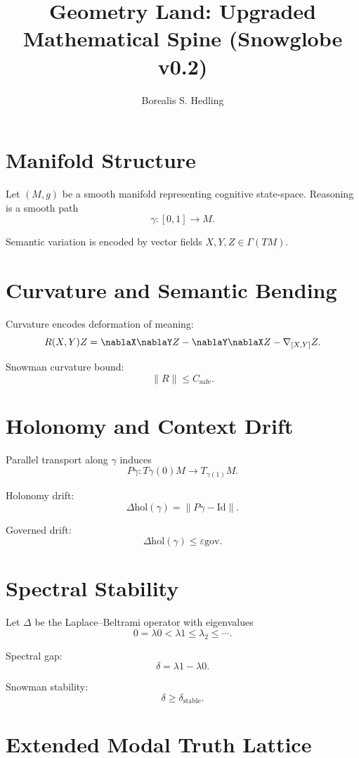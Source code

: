 \documentclass[11pt]{article}
\title{Geometry Land: Upgraded Mathematical Spine (Snowglobe v0.2)}
\author{Borealis S. Hedling}
\date{}
\begin{document}
\maketitle

\section{Manifold Structure}

Let $(M,g)$ be a smooth manifold representing cognitive state-space.
Reasoning is a smooth path
\[
\gamma : [0,1] \to M.
\]

Semantic variation is encoded by vector fields $X,Y,Z \in \Gamma(TM)$.

\section{Curvature and Semantic Bending}

Curvature encodes deformation of meaning:
\[
R(X,Y)Z = \nablaX \nablaY Z - \nablaY \nablaX Z - \nabla_{[X,Y]} Z.
\]

Snowman curvature bound:
\[
\|R\| \leq C_{\mathrm{safe}}.
\]

\section{Holonomy and Context Drift}

Parallel transport along $\gamma$ induces
\[
P\gamma : T{\gamma(0)}M \to T_{\gamma(1)}M.
\]

Holonomy drift:
\[
\Delta{\mathrm{hol}}(\gamma) = \|P\gamma - \mathrm{Id}\|.
\]

Governed drift:
\[
\Delta{\mathrm{hol}}(\gamma) \leq \varepsilon{\mathrm{gov}}.
\]

\section{Spectral Stability}

Let $\Delta$ be the Laplace--Beltrami operator with eigenvalues
\[
0 = \lambda0 < \lambda1 \leq \lambda_2 \leq \cdots.
\]

Spectral gap:
\[
\delta = \lambda1 - \lambda0.
\]

Snowman stability:
\[
\delta \geq \delta_{\mathrm{stable}}.
\]

\section{Extended Modal Truth Lattice}
\end{document}
